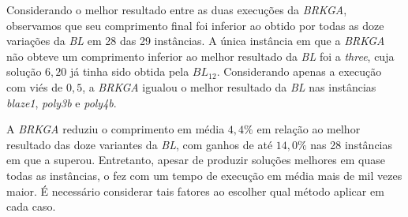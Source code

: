 \documentclass{article}
\begin{document}
Considerando o melhor resultado entre as duas execuções da {\it BRKGA}, observamos que seu comprimento final foi inferior ao obtido por todas as doze variações da {\it BL} em 28 das 29 instâncias. A única instância em que a {\it BRKGA} não obteve um comprimento inferior ao melhor resultado da {\it BL} foi a {\it three}, cuja solução $6,20$ já tinha sido obtida pela $BL_{12}$. Considerando apenas a execução com viés de $0,5$, a {\it BRKGA} igualou o melhor resultado da {\it BL} nas instâncias {\it blaze1}, {\it poly3b} e {\it poly4b}. 

A {\it BRKGA} reduziu o comprimento em média $4,4\%$ em relação ao melhor resultado das doze variantes da {\it BL}, com ganhos de até $14,0\%$ nas 28 instâncias em que a superou. Entretanto, apesar de produzir soluções melhores em quase todas as instâncias, o fez com um tempo de execução em média mais de mil vezes maior. É necessário considerar tais fatores ao escolher qual método aplicar em cada caso.
\end{document}
